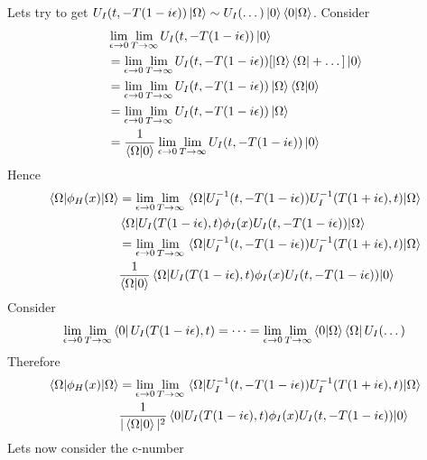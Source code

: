 Lets try to get $U_{I} ( t, -T(1 - i\epsilon) ) \ket{\Omega} \sim U_I (\dots) \ket{0}  \expval{0|\Omega} $. Consider
\begin{align}
      & \lim_{\epsilon \to 0 } \lim_{T \to \infty} U_{I} ( t, -T(1 - i\epsilon) ) \ket{0}\nonumber\\
      & = \lim_{\epsilon \to 0 } \lim_{T \to \infty} U_{I} ( t, -T(1 - i\epsilon) ) [ \ket{\Omega} \bra{\Omega} + \dots  ]\ket{0}\nonumber\\
      & = \lim_{\epsilon \to 0 } \lim_{T \to \infty} U_{I} ( t, -T(1 - i\epsilon) ) \ket{\Omega} \bra{\Omega} \ket{0}\nonumber\\
      & =  \lim_{\epsilon \to 0 } \lim_{T \to \infty} U_{I} ( t, -T(1 - i\epsilon) ) \ket{\Omega} \nonumber\\
      & = \frac{1}{\expval{\Omega|0}}  \lim_{\epsilon \to 0 } \lim_{T \to \infty} U_{I} ( t, -T(1 - i\epsilon) ) \ket{0}
\end{align}
Hence 
\begin{align}
    \mel{\Omega}{ \phi_H  (x) }{\Omega}  & = \lim_{\epsilon \to 0 } \lim_{T \to \infty} \mel{\Omega}{ U_{I}^{-1} (t, -T(1 - i\epsilon)) U_{I}^{-1} ( T(1 + i\epsilon)  , t )  }{\Omega} \nonumber\\ & \mel{\Omega}{ U_{I} ( T(1 - i\epsilon) , t) \phi_I (x) U_{I} ( t, -T(1 - i\epsilon) )  }{\Omega} \nonumber\\
    & = \lim_{\epsilon \to 0 } \lim_{T \to \infty} \mel{\Omega}{ U_{I}^{-1} (t, -T(1 - i\epsilon)) U_{I}^{-1} ( T(1 + i\epsilon)  , t )  }{\Omega} \nonumber\\
    & \frac{1}{\expval{\Omega|0}}  \mel{\Omega}{U_{I} ( T(1 - i\epsilon) , t) \phi_I (x)  U_I (t, -T (1 - i\epsilon ))  }{0}
\end{align}
Consider 
\begin{equation}
    \lim_{\epsilon \to 0 } \lim_{T \to \infty} \bra{0} U_I (T (1 - i\epsilon), t) = \dots =  \lim_{\epsilon \to 0 } \lim_{T \to \infty} \expval{0|\Omega} \bra{\Omega} U_I (\dots)
\end{equation}
Therefore 
\begin{align}
    \mel{\Omega}{ \phi_H  (x) }{\Omega}  & =
      \lim_{\epsilon \to 0 } \lim_{T \to \infty} \mel{\Omega}{ U_{I}^{-1} (t, -T(1 - i\epsilon)) U_{I}^{-1} ( T(1 + i\epsilon)  , t )  }{\Omega} \nonumber\\
    & \frac{1}{|\expval{\Omega|0}|^2}  \mel{0}{U_{I} ( T(1 - i\epsilon) , t) \phi_I (x)  U_I (t, -T (1 - i\epsilon ))  }{0}
\end{align}
Lets now consider the c-number
